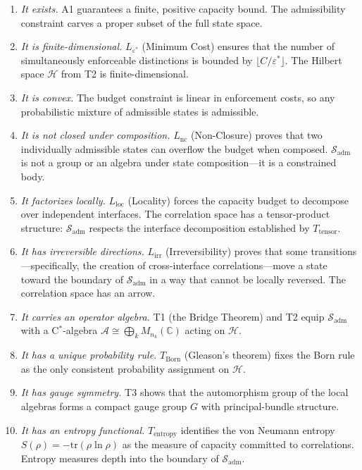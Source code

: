 \documentclass[11pt]{article}
\begin{document}
\begin{enumerate}
\item \textit{It exists.}  A1 guarantees a finite, positive capacity bound.  The admissibility constraint carves a proper subset of the full state space.

\item \textit{It is finite-dimensional.}  $L_{\varepsilon^*}$ (Minimum Cost) ensures that the number of simultaneously enforceable distinctions is bounded by $\lfloor C / \varepsilon^* \rfloor$.  The Hilbert space $\mathcal{H}$ from T2 is finite-dimensional.

\item \textit{It is convex.}  The budget constraint is linear in enforcement costs, so any probabilistic mixture of admissible states is admissible.

\item \textit{It is not closed under composition.}  $L_{\mathrm{nc}}$ (Non-Closure) proves that two individually admissible states can overflow the budget when composed.  $\mathcal{S}_{\mathrm{adm}}$ is not a group or an algebra under state composition---it is a constrained body.

\item \textit{It factorizes locally.}  $L_{\mathrm{loc}}$ (Locality) forces the capacity budget to decompose over independent interfaces.  The correlation space has a tensor-product structure: $\mathcal{S}_{\mathrm{adm}}$ respects the interface decomposition established by $T_{\mathrm{tensor}}$.

\item \textit{It has irreversible directions.}  $L_{\mathrm{irr}}$ (Irreversibility) proves that some transitions---specifically, the creation of cross-interface correlations---move a state toward the boundary of $\mathcal{S}_{\mathrm{adm}}$ in a way that cannot be locally reversed.  The correlation space has an arrow.

\item \textit{It carries an operator algebra.}  T1 (the Bridge Theorem) and T2 equip $\mathcal{S}_{\mathrm{adm}}$ with a C$^*$-algebra $\mathcal{A} \cong \bigoplus_k M_{n_k}(\mathbb{C})$ acting on $\mathcal{H}$.

\item \textit{It has a unique probability rule.}  $T_{\mathrm{Born}}$ (Gleason's theorem) fixes the Born rule as the only consistent probability assignment on $\mathcal{H}$.

\item \textit{It has gauge symmetry.}  T3 shows that the automorphism group of the local algebras forms a compact gauge group $G$ with principal-bundle structure.

\item \textit{It has an entropy functional.}  $T_{\mathrm{entropy}}$ identifies the von Neumann entropy $S(\rho) = -\mathrm{tr}(\rho \ln \rho)$ as the measure of capacity committed to correlations.  Entropy measures depth into the boundary of $\mathcal{S}_{\mathrm{adm}}$.
\end{enumerate}
\end{document}
